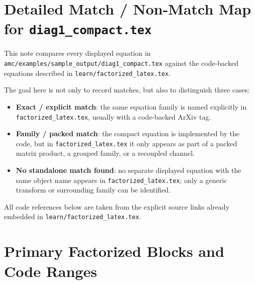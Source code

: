 \documentclass{article}
\begin{document}
\section*{Detailed Match / Non-Match Map for \texttt{diag1\_compact.tex}}

This note compares every displayed equation in
\texttt{amc/examples/sample_output/diag1\_compact.tex} against the
code-backed equations described in \texttt{learn/factorized\_latex.tex}.

The goal here is not only to record matches, but also to distinguish
three cases:
\begin{itemize}
\item \textbf{Exact / explicit match}: the same equation family is named explicitly in
  \texttt{factorized\_latex.tex}, usually with a code-backed ArXiv tag.
\item \textbf{Family / packed match}: the compact equation is implemented by the code,
  but in \texttt{factorized\_latex.tex} it only appears as part of a packed matrix
  product, a grouped family, or a recoupled channel.
\item \textbf{No standalone match found}: no separate displayed equation with the same
  object name appears in \texttt{factorized\_latex.tex}; only a generic transform or
  surrounding family can be identified.
\end{itemize}

All code references below are taken from the explicit source links already
embedded in \texttt{learn/factorized\_latex.tex}.

\section*{Primary Factorized Blocks and Code Ranges}
\end{document}
